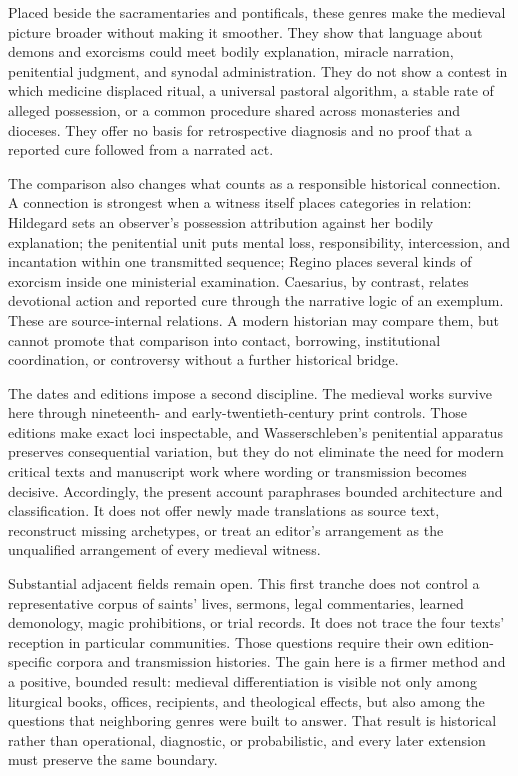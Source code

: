 Placed beside the sacramentaries and pontificals, these genres make the
medieval picture broader without making it smoother. They show that language
about demons and exorcisms could meet bodily explanation, miracle narration,
penitential judgment, and synodal administration. They do not show a contest
in which medicine displaced ritual, a universal pastoral algorithm, a stable
rate of alleged possession, or a common procedure shared across monasteries
and dioceses. They offer no basis for retrospective diagnosis and no proof
that a reported cure followed from a narrated act.

The comparison also changes what counts as a responsible historical
connection. A connection is strongest when a witness itself places categories
in relation: Hildegard sets an observer's possession attribution against her
bodily explanation; the penitential unit puts mental loss, responsibility,
intercession, and incantation within one transmitted sequence; Regino places
several kinds of exorcism inside one ministerial examination. Caesarius, by
contrast, relates devotional action and reported cure through the narrative
logic of an exemplum. These are source-internal relations. A modern historian
may compare them, but cannot promote that comparison into contact, borrowing,
institutional coordination, or controversy without a further historical
bridge.

The dates and editions impose a second discipline. The medieval works survive
here through nineteenth- and early-twentieth-century print controls. Those
editions make exact loci inspectable, and Wasserschleben's penitential
apparatus preserves consequential variation, but they do not eliminate the
need for modern critical texts and manuscript work where wording or
transmission becomes decisive. Accordingly, the present account paraphrases
bounded architecture and classification. It does not offer newly made
translations as source text, reconstruct missing archetypes, or treat an
editor's arrangement as the unqualified arrangement of every medieval
witness.

Substantial adjacent fields remain open. This first tranche does not control a
representative corpus of saints' lives, sermons, legal commentaries, learned
demonology, magic prohibitions, or trial records. It does not trace the four
texts' reception in particular communities. Those questions require their own
edition-specific corpora and transmission histories. The gain here is a
firmer method and a positive, bounded result: medieval differentiation is
visible not only among liturgical books, offices, recipients, and theological
effects, but also among the questions that neighboring genres were built to
answer. That result is historical rather than operational, diagnostic, or
probabilistic, and every later extension must preserve the same boundary.
